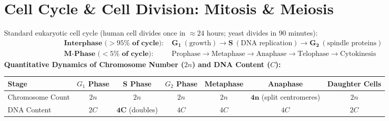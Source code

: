 \documentclass[10pt,a4paper]{article}
\begin{document}
\section{Cell Cycle \& Cell Division: Mitosis \& Meiosis}

\begin{formulabox}
Standard eukaryotic cell cycle (human cell divides once in $\approx 24$ hours; yeast divides in $90$ minutes):
\begin{align*}
  \textbf{Interphase ($>95\%$ of cycle): } & \mathbf{G_1} \ (\text{growth}) \longrightarrow \mathbf{S} \ (\text{DNA replication}) \longrightarrow \mathbf{G_2} \ (\text{spindle proteins})\\
  \textbf{M-Phase ($<5\%$ of cycle): } & \text{Prophase} \longrightarrow \text{Metaphase} \longrightarrow \text{Anaphase} \longrightarrow \text{Telophase} \longrightarrow \text{Cytokinesis}
\end{align*}
\textbf{Quantitative Dynamics of Chromosome Number ($2n$) and DNA Content ($C$):}
\begin{center}
\scriptsize
\begin{tabular}{|l|c|c|c|c|c|c|}
\hline
\textbf{Stage} & \textbf{$G_1$ Phase} & \textbf{S Phase} & \textbf{$G_2$ Phase} & \textbf{Metaphase} & \textbf{Anaphase} & \textbf{Daughter Cells} \\
\hline
Chromosome Count & $2n$ & $2n$ & $2n$ & $2n$ & $\mathbf{4n}$ (split centromeres) & $2n$ \\
DNA Content & $2C$ & $\mathbf{4C}$ (doubles) & $4C$ & $4C$ & $4C$ & $2C$ \\
\hline
\end{tabular}
\end{center}
\end{formulabox}
\end{document}
